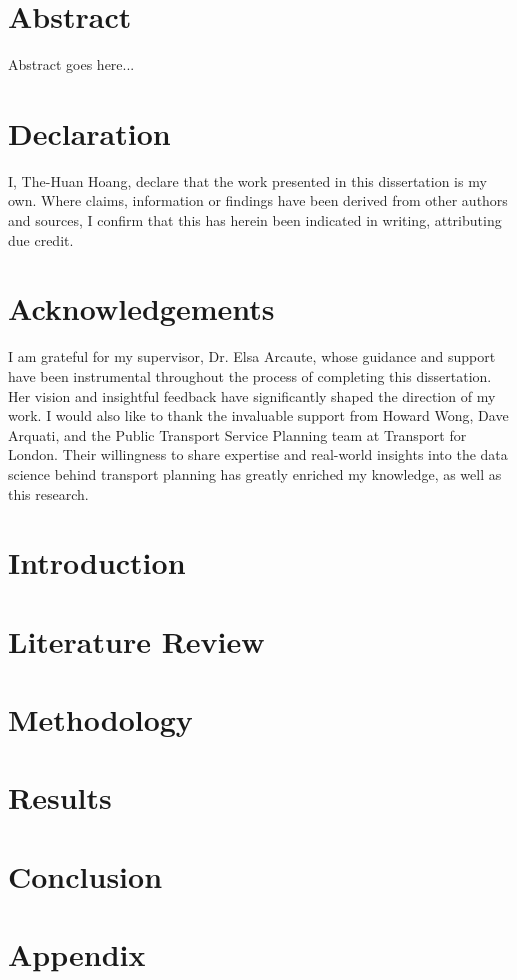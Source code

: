 \documentclass[12pt,twoside]{report}
\begin{document}


\chapter*{Abstract}
Abstract goes here...

\chapter*{Declaration}
I, The-Huan Hoang, declare that the work presented in this dissertation is my own. Where claims, information or findings have been derived from other authors and sources, I confirm that this has herein been indicated in writing, attributing due credit.

\chapter*{Acknowledgements}
I am grateful for my supervisor, Dr. Elsa Arcaute, whose guidance and support have been instrumental throughout the process of completing this dissertation. Her vision and insightful feedback have significantly shaped the direction of my work. I would also like to thank the invaluable support from Howard Wong, Dave Arquati, and the Public Transport Service Planning team at Transport for London. Their willingness to share expertise and real-world insights into the data science behind transport planning has greatly enriched my knowledge, as well as this research.

\tableofcontents

\listoffigures

\listoftables

\chapter{Introduction}


\chapter{Literature Review}


\chapter{Methodology}


\chapter{Results}


\chapter{Conclusion}


\appendix
\chapter{Appendix}


\printbibliography{}
\end{document}
